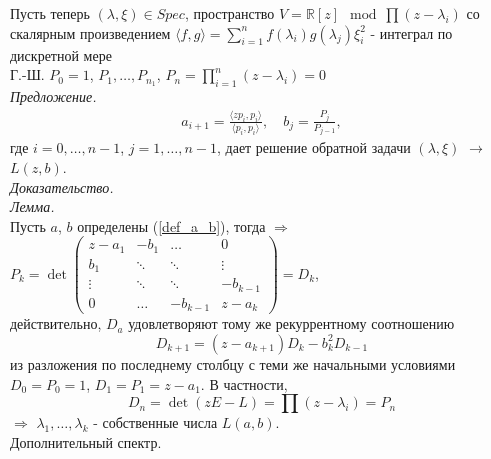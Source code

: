 \documentclass[a4paper,12pt]{article}
\theoremstyle{definition}
\theoremstyle{definition}
\theoremstyle{definition}
\newcommand{\bear}[1]{\begin{eqnarray}\label{#1}}
\newcommand{\ear}{\end{eqnarray}}
\newcommand{\R}{ {\mathbb R} }
\begin{document}
Пусть теперь $(\lambda,\xi) \in Spec$, пространство $V = \R[z] \mod \prod (z - \lambda_{i})$ со скалярным произведением
$\langle f,g \rangle = \displaystyle\sum^{n}_{i=1}f(\lambda_{i})g(\lambda_{j}) \xi^{2}_{i}$ - интеграл по дискретной мере\\
Г.-Ш. $P_{0} = 1$, $P_{1},\ldots,P_{n_1}$, $P_{n} = \displaystyle\prod^{n}_{i=1}(z-\lambda_{i}) =0$\\

\textit{Предложение.} \\
\bear{def_a_b}
a_{i+1} = \displaystyle\frac{\langle zp_{i},p_{i}\rangle}{\langle p_{i},p_{i} \rangle},\quad b_{j} = \frac{P_{j}}{P_{j-1}},
\ear 
где $i=0,\ldots,n-1$, $j=1,\ldots,n-1$, дает решение обратной задачи $(\lambda, \xi)$ $\rightarrow$ $L(z,b)$.\\

\textit{Доказательство.}\\

\textit{Лемма.}\\
Пусть $a$, $b$ определены (\ref{def_a_b}), тогда $\Rightarrow$ $P_{k} = \det{\left( \begin{array}{cccc}
z - a_{1}& -b_{1} &\ldots & 0\\
b_{1}& \ddots &\ddots & \vdots\\
\vdots & \ddots &\ddots & -b_{k-1}\\
0& \ldots & -b_{k-1}  & z-a_{k}
\end{array}\right)} = D_{k}$, \\
действительно, $D_{a}$ удовлетворяют тому же рекуррентному соотношению
\[D_{k+1} = (z - a_{k+1})D_{k} - b^{2}_{k}D_{k-1}\]
из разложения по последнему столбцу с теми же начальными условиями $D_{0} = P_{0} = 1$, $D_{1} = P_{1} = z -a_{1}$.
В частности,
\[D_{n} = \det{\left(zE - L\right)} = \prod(z - \lambda_{i}) = P_{n}\]
$\Rightarrow$ $\lambda_{1},\ldots, \lambda_{k}$  - собственные числа $L(a,b)$.\\

Дополнительный спектр.\\
\end{document}
